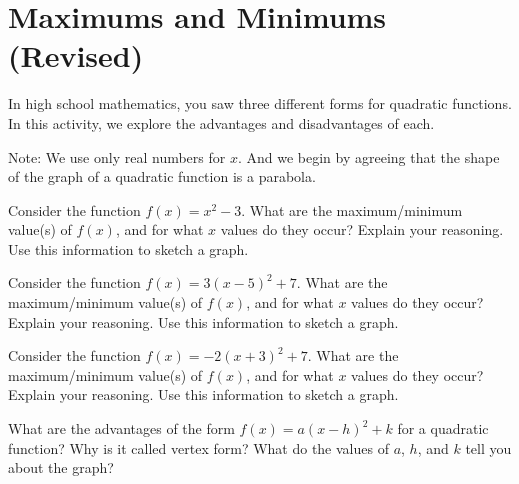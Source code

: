 \newpage
\section{Maximums and Minimums (Revised)}\label{A:vertex}


%
%

  

In high school mathematics, you saw three different forms for quadratic functions.  In this activity, we explore the advantages and disadvantages of each.  

Note:  We use only real numbers for $x$.  And we begin by agreeing that the shape of the graph of a quadratic function is a parabola.  

\begin{prob}
Consider the function $f(x) = x^2 -3$. What are the maximum/minimum value(s) of $f(x)$, and for what $x$ values do they occur? 
Explain your reasoning.  Use this information to sketch a graph.  
\end{prob}

\begin{prob}
Consider the function $f(x) = 3(x-5)^2 +7$. What are the maximum/minimum value(s) of $f(x)$, and for what $x$ values do they occur? Explain your reasoning.  Use this information to sketch a graph.  
\end{prob}

\begin{prob}
Consider the function $f(x) = -2(x+3)^2 + 7$. What are the maximum/minimum value(s) of $f(x)$, and for what $x$ values do they occur? Explain your reasoning.  Use this information to sketch a graph.  
\end{prob}

\begin{prob}
What are the advantages of the form $f(x) = a(x-h)^2+k$ for a quadratic function?  Why is it called vertex form?  What do the values of $a$, $h$, and $k$ tell you about the graph?  
\end{prob}


